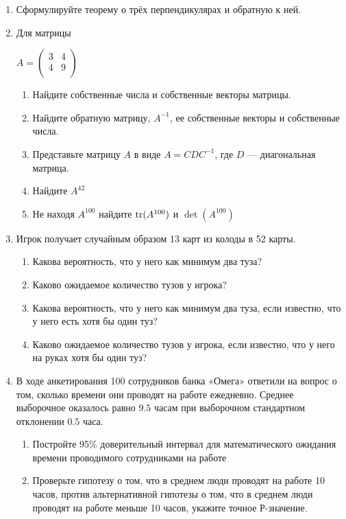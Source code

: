 \documentclass[12pt, a4paper]{article}
\begin{document}
\begin{enumerate}
\item Сформулируйте теорему о трёх перпендикулярах и обратную к ней.
\item Для матрицы

$A=\left(%
\begin{array}{cc}
  3 & 4 \\
  4 & 9 \\
\end{array}%
\right)$ \\

\begin{enumerate}
\item Найдите собственные числа и собственные векторы матрицы.
\item Найдите обратную матрицу, $A^{-1}$, ее собственные векторы и собственные числа.
\item Представьте матрицу $A$ в виде $A=CDC^{-1}$, где $D$ — диагональная матрица.
\item Найдите $A^{42}$
\item Не находя $A^{100}$ найдите $\operatorname{tr}(A^{100})$ и $\det(A^{100})$
\end{enumerate}



\item Игрок получает случайным образом 13 карт из колоды в 52 карты.
\begin{enumerate}
\item Какова вероятность, что у него как минимум два туза?
\item Каково ожидаемое количество тузов у игрока?
\item Какова вероятность, что у него как минимум два туза, если
известно, что у него есть хотя бы один туз?
\item Каково ожидаемое количество тузов у игрока, если известно, что у него на руках хотя бы один туз?
\end{enumerate}


\item В ходе анкетирования 100 сотрудников банка «Омега» ответили на вопрос о том, сколько времени они проводят на работе ежедневно. Среднее выборочное оказалось равно $9.5$ часам при выборочном стандартном отклонении $0.5$ часа.
\begin{enumerate}
\item Постройте 95\% доверительный интервал для математического ожидания времени проводимого сотрудниками на работе
\item Проверьте гипотезу о том, что в среднем люди проводят на работе 10 часов, против альтернативной гипотезы о том, что в среднем люди проводят на работе меньше 10 часов, укажите точное Р-значение.
\end{enumerate}

\end{enumerate}
\end{document}
